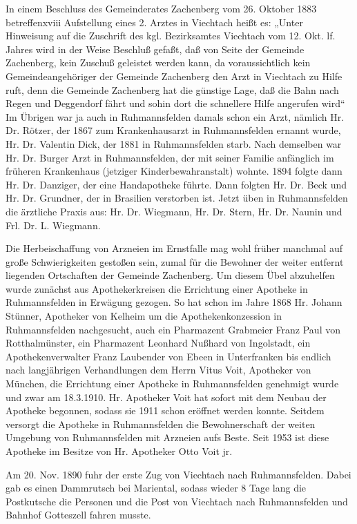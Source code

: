 \documentclass{book}
\begin{document}
In einem Beschluss des Gemeinderates Zachenberg vom 26. Oktober 1883
betreffenxviii Aufstellung eines 2. Arztes in Viechtach heißt es: „Unter
Hinweisung auf die Zuschrift des kgl. Bezirksamtes Viechtach vom 12. Okt. lf.
Jahres wird in der Weise Beschluß gefaßt, daß von Seite der Gemeinde Zachenberg,
kein Zuschuß geleistet werden kann, da voraussichtlich kein Gemeindeangehöriger
der Gemeinde Zachenberg den Arzt in Viechtach zu Hilfe ruft, denn die Gemeinde
Zachenberg hat die günstige Lage, daß die Bahn nach Regen und Deggendorf fährt
und sohin dort die schnellere Hilfe angerufen wird“ Im Übrigen war ja auch in
Ruhmannsfelden damals schon ein Arzt, nämlich Hr. Dr. Rötzer, der 1867 zum
Krankenhausarzt in Ruhmannsfelden ernannt wurde, Hr. Dr. Valentin Dick, der 1881
in Ruhmannsfelden starb. Nach demselben war Hr. Dr. Burger Arzt in
Ruhmannsfelden, der mit seiner Familie anfänglich im früheren Krankenhaus
(jetziger Kinderbewahranstalt) wohnte. 1894 folgte dann Hr. Dr. Danziger, der
eine Handapotheke führte. Dann folgten Hr. Dr. Beck und Hr. Dr. Grundner, der in
Brasilien verstorben ist. Jetzt üben in Ruhmannsfelden die ärztliche Praxis aus:
Hr. Dr. Wiegmann, Hr. Dr. Stern, Hr. Dr. Naunin und Frl. Dr. L. Wiegmann.

Die Herbeischaffung von Arzneien im Ernstfalle mag wohl früher manchmal auf
große Schwierigkeiten gestoßen sein, zumal für die Bewohner der weiter entfernt
liegenden Ortschaften der Gemeinde Zachenberg. Um diesem Übel abzuhelfen wurde
zunächst aus Apothekerkreisen die Errichtung einer Apotheke in Ruhmannsfelden in
Erwägung gezogen. So hat schon im Jahre 1868 Hr. Johann Stünner, Apotheker von
Kelheim um die Apothekenkonzession in Ruhmannsfelden nachgesucht, auch ein
Pharmazent Grabmeier Franz Paul von Rotthalmünster, ein Pharmazent Leonhard
Nußhard von Ingolstadt, ein Apothekenverwalter Franz Laubender von Ebeen in
Unterfranken bis endlich nach langjährigen Verhandlungen dem Herrn Vitus Voit,
Apotheker von München, die Errichtung einer Apotheke in Ruhmannsfelden genehmigt
wurde und zwar am 18.3.1910. Hr. Apotheker Voit hat sofort mit dem Neubau der
Apotheke begonnen, sodass sie 1911 schon eröffnet werden konnte. Seitdem
versorgt die Apotheke in Ruhmannsfelden die Bewohnerschaft der weiten Umgebung
von Ruhmannsfelden mit Arzneien aufs Beste. Seit 1953 ist diese Apotheke im
Besitze von Hr. Apotheker Otto Voit jr.

Am 20. Nov. 1890 fuhr der erste Zug von Viechtach nach Ruhmannsfelden. Dabei gab
es einen Dammrutsch bei Mariental, sodass wieder 8 Tage lang die Postkutsche die
Personen und die Post von Viechtach nach Ruhmannsfelden und Bahnhof Gotteszell
fahren musste.
\end{document}
